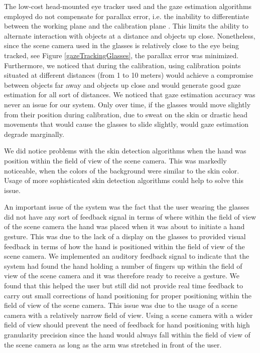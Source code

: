 \documentclass[jou,a4paper,notxfonts]{apa}
\begin{document}
The low-cost head-mounted eye tracker used and the gaze estimation algorithms employed do not compensate for parallax
error, i.e. the inability to differentiate between the working plane and the calibration plane
\cite{mardanbegi2012parallax}. This limits the ability to alternate interaction with objects at a distance and objects
up close. Nonetheless, since the scene camera used in the glasses is relatively close to the eye being tracked, see Figure
\ref{gazeTrackingGlasses}, the parallax error was minimized. Furthermore, we noticed that during the calibration, using                                                                                                                                                                                                                                                                                                                                                                                                                                 
calibration points situated at different distances (from 1 to 10 meters) would achieve a compromise between objects
far away and objects up close and would generate good gaze estimation for all sort of distances. We noticed that
gaze estimation accuracy was never an issue for our system. Only over time, if the glasses would move slightly from
their position during calibration, due to sweat on the skin or drastic head movements that would cause the glasses to slide slightly, would gaze estimation degrade marginally.


We did notice problems with the skin detection algorithms when the hand was position within the field of view of the
scene camera. This was markedly noticeable, when the colors of the background were similar to the skin color. Usage of
more sophisticated skin detection algorithms could help to solve this issue.


An important issue of the system was the fact that the user wearing the glasses did not have any sort of feedback signal in
terms of where within the field of view of the scene camera the hand was placed when it was about to initiate a hand
gesture. This was due to the lack of a display on the glasses to provided visual feedback in terms of how the hand is
positioned within the field of view of the scene camera. We implemented an auditory feedback signal to indicate
that the system had found the hand holding a number of fingers up within the field of view of the scene camera and it was therefore ready to receive a
gesture. We found that this helped the user but still did not provide real time feedback to carry out small
corrections of hand positioning for proper positioning within the field of view of the scene camera. This issue was due
to the usage of a scene camera with a relatively narrow field of view. Using a scene camera with a wider field of view
should prevent the need of feedback for hand positioning with high granularity precision since the hand would always fall within the field of view of the scene camera as long as the arm was stretched in front of the user.
 
\end{document}
